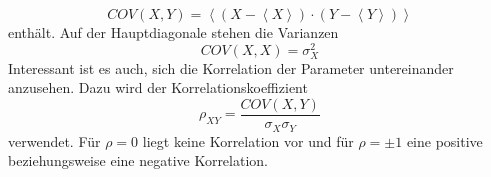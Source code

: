 \begin{equation}
COV(X,Y)=\left<\left(X-\left<X\right>\right)\cdot\left(Y-\left<Y\right>\right)\right>
\end{equation}
enthält. Auf der Hauptdiagonale stehen die Varianzen
\begin{equation}
COV(X,X)=\sigma_X^2
\end{equation}
Interessant ist es auch, sich die Korrelation der Parameter untereinander anzusehen. Dazu wird der Korrelationskoeffizient 
\begin{equation}
\rho_{XY}=\frac{COV(X,Y)}{\sigma_X\sigma_Y}
\end{equation}
verwendet. Für $\rho=0$ liegt keine Korrelation vor und für $\rho=\pm1$ eine positive beziehungsweise eine negative Korrelation.

